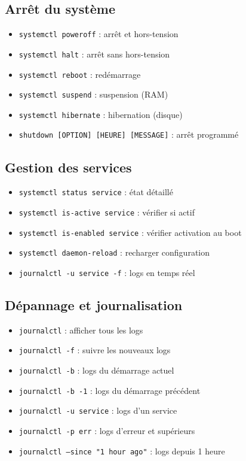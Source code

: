 \documentclass[12pt,a4paper]{article}
\begin{document}
\subsection{Arr\^et du syst\`eme}
\begin{itemize}
    \item \texttt{systemctl poweroff} : arr\^et et hors-tension
    \item \texttt{systemctl halt} : arr\^et sans hors-tension
    \item \texttt{systemctl reboot} : red\'emarrage
    \item \texttt{systemctl suspend} : suspension (RAM)
    \item \texttt{systemctl hibernate} : hibernation (disque)
    \item \texttt{shutdown [OPTION] [HEURE] [MESSAGE]} : arr\^et programm\'e
\end{itemize}

\subsection{Gestion des services}
\begin{itemize}
    \item \texttt{systemctl status service} : \'etat d\'etaill\'e
    \item \texttt{systemctl is-active service} : v\'erifier si actif
    \item \texttt{systemctl is-enabled service} : v\'erifier activation au boot
    \item \texttt{systemctl daemon-reload} : recharger configuration
    \item \texttt{journalctl -u service -f} : logs en temps r\'eel
\end{itemize}

\subsection{D\'epannage et journalisation}
\begin{itemize}
    \item \texttt{journalctl} : afficher tous les logs
    \item \texttt{journalctl -f} : suivre les nouveaux logs
    \item \texttt{journalctl -b} : logs du d\'emarrage actuel
    \item \texttt{journalctl -b -1} : logs du d\'emarrage pr\'ec\'edent
    \item \texttt{journalctl -u service} : logs d'un service
    \item \texttt{journalctl -p err} : logs d'erreur et sup\'erieurs
    \item \texttt{journalctl --since "1 hour ago"} : logs depuis 1 heure
\end{itemize}
\end{document}

